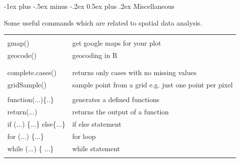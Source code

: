 \documentclass[10pt,landscape]{article}
\makeatletter
\renewcommand{\section}{\@startsection{section}{1}{0mm}%
                                {-1ex plus -.5ex minus -.2ex}%
                                {0.5ex plus .2ex}%
                                {\normalfont\large\bfseries}}
\makeatother
\begin{document}
\begin{multicols}{3}


% 
% 
% 
% 

\bigskip

\section{Miscellaneous}

Some useful commands which are related to spatial data analysis.


\begin{tabular}{@{}p{\the\MyLen}%
                @{}p{\linewidth-\the\MyLen}@{}}
                & \\
gmap() & get google maps for your plot \\
geocode() & geocoding in R \\


&  \\
 &  \\

complete.cases() &  returns only cases with no missing values \\                
gridSample() & sample point from a grid e.g. just one point per pixel \\

 & \\
function(...)\{..\} & generates a defined functions\\
return(...) & returns the output of a function \\
if (...) \{...\} else\{...\} & if else statement \\
for (...) \{...\} & for loop \\
while (...) \{ ...\} & while statement \\
 & \\



\end{tabular}
\end{multicols}
\end{document}
